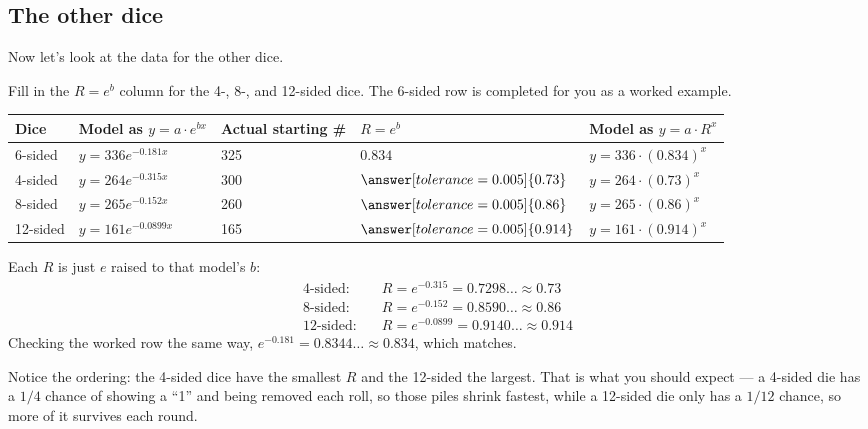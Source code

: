 \documentclass[12pt]{ximera}
\begin{document}
\subsection*{The other dice}

Now let's look at the data for the other dice.

\begin{problem}
Fill in the $R = e^{b}$ column for the 4-, 8-, and 12-sided dice. The 6-sided row is
completed for you as a worked example.

\begin{center}
\begin{tabular}{|l|l|l|l|l|}
\hline
Dice & Model as $y = a \cdot e^{bx}$ & Actual starting \# & $R = e^{b}$ & Model as $y = a \cdot R^{x}$ \\
\hline
6-sided & $y = 336 e^{-0.181x}$ & 325 & $0.834$ & $y = 336 \cdot (0.834)^{x}$ \\
\hline
4-sided & $y = 264 e^{-0.315x}$ & 300 & $\answer[tolerance=0.005]{0.73}$ & $y = 264 \cdot (0.73)^{x}$ \\
\hline
8-sided & $y = 265 e^{-0.152x}$ & 260 & $\answer[tolerance=0.005]{0.86}$ & $y = 265 \cdot (0.86)^{x}$ \\
\hline
12-sided & $y = 161 e^{-0.0899x}$ & 165 & $\answer[tolerance=0.005]{0.914}$ & $y = 161 \cdot (0.914)^{x}$ \\
\hline
\end{tabular}
\end{center}

\begin{solution}
Each $R$ is just $e$ raised to that model's $b$:
\begin{align*}
\text{4-sided:} \quad & R = e^{-0.315} = 0.7298\ldots \approx 0.73 \\
\text{8-sided:} \quad & R = e^{-0.152} = 0.8590\ldots \approx 0.86 \\
\text{12-sided:} \quad & R = e^{-0.0899} = 0.9140\ldots \approx 0.914
\end{align*}
Checking the worked row the same way, $e^{-0.181} = 0.8344\ldots \approx 0.834$, which
matches.

Notice the ordering: the 4-sided dice have the smallest $R$ and the 12-sided the
largest. That is what you should expect --- a 4-sided die has a $1/4$ chance of showing
a ``1'' and being removed each roll, so those piles shrink fastest, while a 12-sided die
only has a $1/12$ chance, so more of it survives each round.
\end{solution}
\end{problem}
\end{document}
